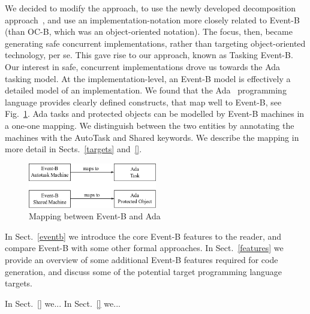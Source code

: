 We decided to modify the approach, to use the newly developed decomposition approach~\cite{decomp2010c,decomp2010b}, and use an implementation-notation more closely related to Event-B (than OC-B, which was an object-oriented notation). The focus, then, became generating safe concurrent implementations, rather than targeting object-oriented technology, per se. This gave rise to our approach, known as Tasking Event-B. Our interest in safe, concurrent implementations drove us towards the Ada tasking model. At the implementation-level, an Event-B model is effectively a detailed model of an implementation. We found that the Ada~\cite{ada2005} programming language provides clearly defined constructs, that map well to Event-B, see Fig.~\ref{fig:B_Ada}. Ada tasks and protected objects can be modelled by Event-B machines in a one-one mapping. We distinguish between the two entities by annotating the machines with the AutoTask and Shared keywords. We describe the mapping in more detail in Sects.~\ref{targets} and~\ref{}.
%
\begin{figure}
\centering
\includegraphics[width=0.5\textwidth]{graphics/B_Ada.png}
\caption{Mapping between Event-B and Ada}
\label{fig:B_Ada}
\end{figure}
%

In Sect.~\ref{eventb} we introduce the core Event-B features to the reader, and compare Event-B with some other formal approaches.  In Sect.~\ref{features} we provide an overview of some additional Event-B features required for code generation, and discuss some of the potential target programming language targets.

In Sect.~\ref{} we...
In Sect.~\ref{} we...

